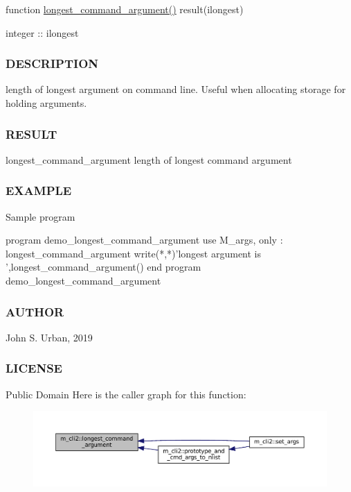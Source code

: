 function \mbox{\hyperlink{namespacem__cli2_a7240f12031027172b87fde623bd77958}{longest\+\_\+command\+\_\+argument()}} result(ilongest)

integer \+:\+: ilongest

\subsubsection*{D\+E\+S\+C\+R\+I\+P\+T\+I\+ON}

length of longest argument on command line. Useful when allocating storage for holding arguments. \subsubsection*{R\+E\+S\+U\+LT}

longest\+\_\+command\+\_\+argument length of longest command argument \subsubsection*{E\+X\+A\+M\+P\+LE}

Sample program \begin{DoxyVerb} program demo_longest_command_argument
 use M_args, only : longest_command_argument
    write(*,*)'longest argument is ',longest_command_argument()
 end program demo_longest_command_argument
\end{DoxyVerb}
 \subsubsection*{A\+U\+T\+H\+OR}

John S. Urban, 2019 \subsubsection*{L\+I\+C\+E\+N\+SE}

Public Domain Here is the caller graph for this function\+:\nopagebreak
\begin{figure}[H]
\begin{center}
\leavevmode
\includegraphics[width=350pt]{namespacem__cli2_a7240f12031027172b87fde623bd77958_icgraph}
\end{center}
\end{figure}
\mbox{\label{namespacem__cli2_a6d2d93ab8471667e632bf7a0e95ebd13}} 
